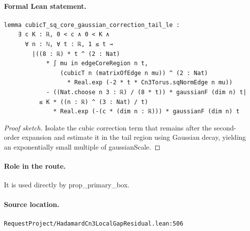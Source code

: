 \medskip
\paragraph{Formal Lean statement.}
\begin{verbatim}
lemma cubicT_sq_core_gaussian_correction_tail_le :
    ∃ c K : ℝ, 0 < c ∧ 0 < K ∧
      ∀ n : ℕ, ∀ t : ℝ, 1 ≤ t →
        |((8 : ℝ) * t ^ (2 : Nat)
            * ∫ mu in edgeCoreRegion n t,
                (cubicT n (matrixOfEdge n mu)) ^ (2 : Nat)
                  * Real.exp (-2 * t * Cn3Torus.sqNormEdge n mu))
            - ((Nat.choose n 3 : ℝ) / (8 * t)) * gaussianF (dim n) t|
          ≤ K * ((n : ℝ) ^ (3 : Nat) / t)
              * Real.exp (-(c * (dim n : ℝ))) * gaussianF (dim n) t
\end{verbatim}
\begin{proof}[Proof sketch]
Isolate the cubic correction term that remains after the second-order expansion and estimate it in the tail region using Gaussian decay, yielding an exponentially small multiple of gaussianScale.
\end{proof}
\paragraph{Role in the route.}
It is used directly by prop\_primary\_box.
\paragraph{Source location.}
\texttt{RequestProject/HadamardCn3LocalGapResidual.lean:506}
\medskip
